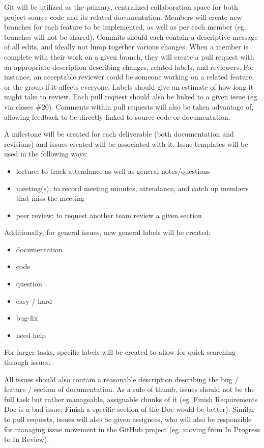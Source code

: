 \documentclass{article}
\begin{document}
Git will be utilized as the primary, centralized collaboration space for both project
source code and its related documentation. Members will create new branches for each
feature to be implemented, as well as per each member (eg. branches will not be shared). 
Commits should each contain a descriptive message of all edits, and ideally not lump together various changes. 
When a member is complete with their work on a given branch, they will create a pull request
with an appropriate description describing changes, related labels, and reviewers. 
For instance, an acceptable reviewer could be someone working on a related feature, 
or the group if it affects everyone. Labels should give an estimate of how long it might take to
review. Each pull request should also be linked to a given issue (eg. via closes \#20). Comments within pull 
requests will also be taken advantage of, allowing feedback to be directly linked to source
code or documentation.

A milestone will be created for each deliverable (both documentation and revisions) and issues
created will be associated with it. Issue templates will be used in the following ways:

\begin{itemize}
  \item lecture: to track attendance as well as general notes/questions
  \item meeting(s): to record meeting minutes, attendance, and catch up members that miss the meeting
  \item peer review: to request another team review a given section
\end{itemize}

Additionally, for general issues, new general labels will be created:

\begin{itemize}
  \item documentation
  \item code
  \item question
  \item easy / hard
  \item bug-fix
  \item need help
\end{itemize}

For larger tasks, specific labels will be created to allow for quick searching through issues.

All issues should also contain a reasonable description describing the bug / feature / 
section of documentation. As a rule of thumb, issues should not be the full task but rather
manageable, assignable chunks of it (eg. Finish Requirements Doc is a bad issue; Finish a specific 
section of the Doc would be better). Similar to pull requests, issues will also be given assignees, 
who will also be responsible for managing issue movement in the GitHub project (eg. moving from 
In Progress to In Review).
\end{document}
